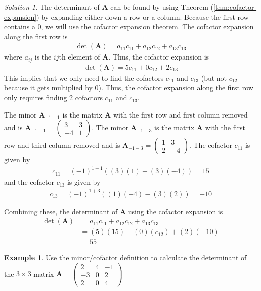 \documentclass[
]{book}
\theoremstyle{definition}
\theoremstyle{definition}
\newtheorem{example}{Example}[chapter]
\theoremstyle{definition}
\theoremstyle{definition}
\theoremstyle{remark}
\newtheorem*{solution}{Solution}
\begin{document}
\begin{solution}
The determinant of \(\mathbf{A}\) can be found by using Theorem (\ref{thm:cofactor-expansion}) by expanding either down a row or a column. Because the first row contains a 0, we will use the cofactor expansion theorem. The cofactor expansion along the first row is
\[
\begin{aligned}
\det(\mathbf{A}) = a_{11} c_{11} + a_{12} c_{12} + a_{13} c_{13}
\end{aligned}
\]
where \(a_{ij}\) is the \(ij\)th element of \(\mathbf{A}\). Thus, the cofactor expansion is
\[
\begin{aligned}
\det(\mathbf{A}) = 5 c_{11} + 0 c_{12} + 2 c_{13}
\end{aligned}
\]
This implies that we only need to find the cofactors \(c_{11}\) and \(c_{13}\) (but not \(c_{12}\) because it gets multiplied by 0). Thus, the cofactor expansion along the first row only requires finding 2 cofactors \(c_{11}\) and \(c_{13}\).

The minor \(\mathbf{A}_{-1-1}\) is the matrix \(\mathbf{A}\) with the first row and first column removed and is \(\mathbf{A}_{-1-1} = \begin{pmatrix} 3 & 3 \\ -4 & 1 \end{pmatrix}\). The minor \(\mathbf{A}_{-1-3}\) is the matrix \(\mathbf{A}\) with the first row and third column removed and is \(\mathbf{A}_{-1-3} = \begin{pmatrix} 1 & 3 \\ 2 & -4 \end{pmatrix}\). The cofactor \(c_{11}\) is given by
\[
\begin{aligned}
c_{11} = (-1)^{1+1}((3)(1) - (3) (-4)) = 15
\end{aligned}
\]
and the cofactor \(c_{13}\) is given by
\[
\begin{aligned}
c_{13} = (-1)^{1+3}((1)(-4) - (3) (2)) = -10
\end{aligned}
\]

Combining these, the determinant of \(\mathbf{A}\) using the cofactor expansion is
\[
\begin{aligned}
\det(\mathbf{A}) & = a_{11} c_{11} + a_{12} c_{12} + a_{13} c_{13} \\
& = (5) (15) + (0) (c_{12}) + (2) (-10) \\
& = 55
\end{aligned}
\]
\end{solution}

\begin{example}
Use the minor/cofactor definition to calculate the determinant of the \(3 \times 3\) matrix \(\mathbf{A} = \begin{pmatrix} 2 & 4 & -1 \\ -3 & 0 & 2 \\ 2 & 0 & 4 \end{pmatrix}\)
\end{example}
\end{document}
